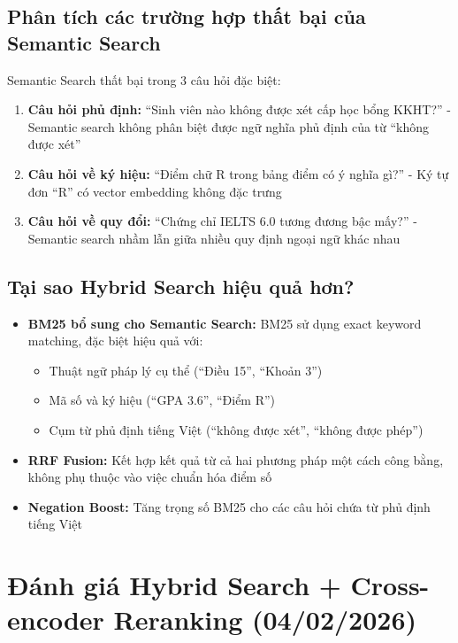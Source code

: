 \documentclass[../DoAn.tex]{subfiles}
\begin{document}
\subsection{Phân tích các trường hợp thất bại của Semantic Search}

Semantic Search thất bại trong 3 câu hỏi đặc biệt:

\begin{enumerate}
    \item \textbf{Câu hỏi phủ định:} ``Sinh viên nào không được xét cấp học bổng KKHT?'' - Semantic search không phân biệt được ngữ nghĩa phủ định của từ ``không được xét''
    
    \item \textbf{Câu hỏi về ký hiệu:} ``Điểm chữ R trong bảng điểm có ý nghĩa gì?'' - Ký tự đơn ``R'' có vector embedding không đặc trưng
    
    \item \textbf{Câu hỏi về quy đổi:} ``Chứng chỉ IELTS 6.0 tương đương bậc mấy?'' - Semantic search nhầm lẫn giữa nhiều quy định ngoại ngữ khác nhau
\end{enumerate}

\subsection{Tại sao Hybrid Search hiệu quả hơn?}

\begin{itemize}
    \item \textbf{BM25 bổ sung cho Semantic Search:} BM25 sử dụng exact keyword matching, đặc biệt hiệu quả với:
    \begin{itemize}
        \item Thuật ngữ pháp lý cụ thể (``Điều 15'', ``Khoản 3'')
        \item Mã số và ký hiệu (``GPA 3.6'', ``Điểm R'')
        \item Cụm từ phủ định tiếng Việt (``không được xét'', ``không được phép'')
    \end{itemize}
    
    \item \textbf{RRF Fusion:} Kết hợp kết quả từ cả hai phương pháp một cách công bằng, không phụ thuộc vào việc chuẩn hóa điểm số
    
    \item \textbf{Negation Boost:} Tăng trọng số BM25 cho các câu hỏi chứa từ phủ định tiếng Việt
\end{itemize}

\section{Đánh giá Hybrid Search + Cross-encoder Reranking (04/02/2026)}
\end{document}
